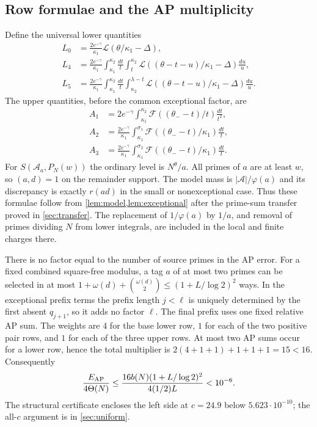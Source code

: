 \documentclass[11pt]{article}
\theoremstyle{definition}
\newcommand{\A}{\mathcal A}
\newcommand{\Th}{\Theta(N)}
\newcommand{\Fup}{\mathcal F}
\newcommand{\Flow}{\mathcal L}
\begin{document}
\subsection{Row formulae and the AP multiplicity}

Define the universal lower quantities
\begin{align}
 L_0&=\frac{2e^{-\gamma}}{\kappa_1}
       \Flow(\theta/\kappa_1-\Delta),\label{eq:L0}\\
 L_4&=\frac{2e^{-\gamma}}{\kappa_1}
 \int_{\kappa_1}^{\kappa_2}\frac{dt}{t}
 \int_t^{\kappa_2}\Flow((\theta-t-u)/\kappa_1-\Delta)\frac{du}{u},\\
 L_5&=\frac{2e^{-\gamma}}{\kappa_1}
 \int_{\kappa_1}^{\kappa_2}\frac{dt}{t}
 \int_{\kappa_2}^{\lambda-t}\Flow((\theta-t-u)/\kappa_1-\Delta)\frac{du}{u}.
\end{align}
The upper quantities, before the common exceptional factor, are
\begin{align}
 A_1&=2e^{-\gamma}\int_{\kappa_1}^{\kappa_2}
 \Fup((\theta_--t)/t)\frac{dt}{t^2},\\
 A_2&=\frac{2e^{-\gamma}}{\kappa_1}
 \int_{\kappa_1}^{\sigma_1}\Fup((\theta_--t)/\kappa_1)\frac{dt}{t},\\
 A_3&=\frac{2e^{-\gamma}}{\kappa_1}
 \int_{\kappa_1}^{\sigma_2}\Fup((\theta_--t)/\kappa_1)\frac{dt}{t}.
\end{align}
For $S(\A_a,P_N(w))$ the ordinary level is $N^\theta/a$.  All primes
of $a$ are at least $w$, so $(a,d)=1$ on the remainder support.
The model mass is $|\A|/\varphi(a)$ and its discrepancy is exactly
$r(ad)$ in the small or nonexceptional case.  Thus these formulae
follow from \cref{lem:model,lem:exceptional} after the prime-sum transfer
proved in \cref{sec:transfer}.  The replacement of $1/\varphi(a)$ by
$1/a$, and removal of primes dividing $N$ from lower integrals, are
included in the local and finite charges there.

There is no factor equal to the number of source primes in the AP error.
For a fixed combined square-free modulus, a tag $a$ of at most two primes
can be selected in at most
$1+\omega(d)+\binom{\omega(d)}2\le(1+L/\log2)^2$ ways.  In the
exceptional prefix terms the prefix length $j<\ell$ is uniquely
determined by the first absent $q_{j+1}$, so it adds no factor $\ell$.
The final prefix uses one fixed relative AP sum.  The weights are
$4$ for the base lower row, $1$ for each of the two positive pair rows,
and $1$ for each of the three upper rows.  At most two AP sums occur for
a lower row, hence the total multiplier is
$2(4+1+1)+1+1+1=15<16$.  Consequently
\begin{equation}\label{eq:ordinary-AP-cost}
 \frac{E_{\rm AP}}{4\Th}\le
 \frac{16b(N)(1+L/\log2)^2}{4(1/2)L}<10^{-6}.
\end{equation}
The structural certificate encloses the left side at $c=24.9$ below
$5.623\cdot10^{-10}$; the all-$c$ argument is in \cref{sec:uniform}.
\end{document}
